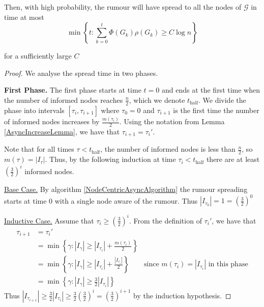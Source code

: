 \begin{theorem}\label{theorem:AsyncUpperBound}
	\ModelIntro Then, with high probability, the rumour will have spread to all the nodes of $\mathcal{G}$ in time at most
	$$
		\min \left\{t : \sum_{k=0}^t \Phi(G_k)\rho(G_k) \geq C \log n \right\} 
	$$
	
	\noindent
	for a sufficiently large $C$
\end{theorem}

\begin{proof}
	We analyse the spread time in two phases. 


	\textbf{First Phase.} The first phase starts at time $t=0$ and ends at the first time when the number of informed nodes reaches $\frac{n}{2}$, which we denote $t_\text{half}$. We divide the phase into intervals $[\tau_i, \tau_{i+1}]$ where $\tau_0 = 0$ and $\tau_{i+1}$ is the first time the number of informed nodes increases by $\frac{m(\tau_i)}{2}$. 
	Using the notation from Lemma \ref{AsyncIncreaseLemma}, we have that $\tau_{i+1} = \tau_i'$. 
	
	Note that for all times $\tau < t_\text{half}$, the number of informed nodes is less than $\frac{n}{2}$, so $m(\tau) = |I_\tau|$. Thus, by the following induction at time $\tau_i < t_\text{half}$ there are at least $(\frac{3}{2})^i$ informed nodes.

	\underline{Base Case.}
	By algorithm \ref{NodeCentricAsyncAlgorithm} the rumour spreading starts at time 0 with a single node aware of the rumour. Thus $|I_{\tau_0}| = 1 = (\frac{3}{2})^0$

	\underline{Inductive Case.} 
	Assume that $\tau_i \geq (\frac{3}{2})^i$.
	From the definition of $\tau_i'$, we have that 
	\begin{align*}
		\tau_{i+1} &= \tau_i' \\
		&= \min\left\{\gamma : |I_{\gamma}| \geq |I_{\tau_i}| + \frac{m(\tau_i)}{2}\right\} \\
		&= \min\left\{\gamma : |I_{\gamma}| \geq |I_{\tau_i}| + \frac{|I_{\tau_i}|}{2}\right\} & \text{since } m(\tau_i) = |I_{\tau _i}| \text{ in this phase} \\ 
		&= \min\left\{\gamma : |I_{\gamma}| \geq \frac{3}{2}|I_{\tau_i}|\right\} 
	\end{align*}
	Thus $|I_{\tau_{i+1}}| \geq \frac{3}{2}|I_{\tau_i}| \geq \frac{3}{2}(\frac{3}{2})^i = (\frac{3}{2})^{i+1}$ by the induction hypothesis. 
	

\end{proof}
